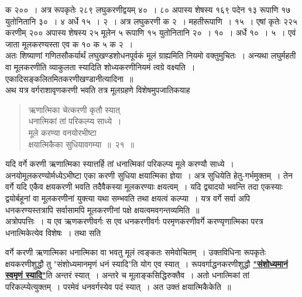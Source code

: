 \documentclass[11pt, openany]{book}
\begin{document}
\noindent क २००~। अत्र रूपकृतेः २८९ लघुकरणीद्वयम् ४०~। ८० अपास्य शेषस्य १६९ पदेन १३ रूपाणि १७ युतोनितानि ३०~। ४ अर्धे १५~। २~। अत्र 
लघुकरणी क २~। महतीरूपाणि~। १५~। एषां कृतेः २२५ करणीम् २०० 
अपास्य शेषस्य २५ मूलेन ५ रूपाणि १५ युतोनितानि २०~। १०~। 
अर्धे १०~। ५~। एवं जाता मूलकरण्यस्ता एव क १० क ५ क २~। \\

\vspace{-3mm}
 अतः शिष्याणां गणितसौकर्यार्थं लघुखण्डशोधनपूर्वकं मूलं ग्राह्यमिति 
नियमो वक्तुमुचितः~। अन्यथा लघुर्महती वा मूलकरणीति व्याकुलता स्यादिति 
शोध्यकरणीनियमं त्वग्रे वक्ष्यति~। एकादिसङ्कलितमितकरणीखण्डानीत्यादिना~॥ \\

\vspace{-3mm}
 अथ यत्र वर्गराशावृणकरणी भवति तत्र मूलग्रहणे विशेषमुपजातिकयाह\textendash 

 \label{21}
\begin{quote}
    \bs
      ऋणात्मिका चेत्करणी कृतौ स्यात् \\

\vspace{-7mm}
\hspace{1cm} धनात्मिकां तां परिकल्प्य साध्ये~। \\

 \vspace{-7mm}
 मूले करण्या वनयोरभीष्टा \\

\vspace{-7mm}
\hspace{1cm} क्षयात्मिकैका सुधियावगम्या~॥~२१~॥
\end{quote}

 यदि वर्गे करणी ऋणात्मिका स्यात्तर्हि तां धनात्मिकां परिकल्प्य 
मूले करण्यौ साध्ये~। अनयोमूलकरण्योर्मध्येऽभीष्टा एका करणी सुधिया 
क्षयात्मिका ज्ञेया~। अत्र सुधियेति हेतु-गर्भमुक्तम्~। तेन वर्गे यदि एकैव 
क्षयकरणी भवति तदैवैकस्या मूलकरण्याः क्षयत्वम्~। यदि द्व्यादयो भवन्ति तदा
एकस्याः द्वयोर्बहूनां वा मूलकरणीनां युक्त्या यथा सम्भवति तथा 
क्षयत्वं कल्प्या~। यत्र वर्गे सर्वा अपि धनकरण्यस्तत्रापि सर्वासामपि 
मूलकरणीनां पक्षे क्षयत्वमवगन्तव्यमिति~॥ \\

\vspace{-3mm}
 अत्रोपपत्तिः~। य एव ऋणकरणीवर्गः स एव धनकरणीवर्गः 
परमृणकरणीवर्गे करण्यृणात्मिका परत्र धनात्मिकेत्येव विशेषः~। तथा सति
\newpage%

\noindent वर्गे करणी ऋणात्मिका धनात्मिका वा भवतु मूलं त्वङ्कतः समेवोचितम्~। उक्तविधिना रूपकृतेः क्षयकरणीशुद्धौ तु {\qt "संशोध्यमानमृणं धनं स्यादि"}ति योग एव स्यात्~। रूपवर्गाद्धनकरणीशुद्धौ \hyperref[1.3]{\textbf{"संशोध्यमानं स्वमृणं स्यादि"}}ति अन्तरं स्यात्~। अन्तरे च मूलाङ्कसिद्धिरुक्तैव~। अतो धनात्मिकां तां परिकल्प्येत्युक्तम्~। परमेवं धनवर्गस्येव पदं स्यात्~। अत उक्तं क्षयात्मिकैकेति~॥ \\
\end{document}
